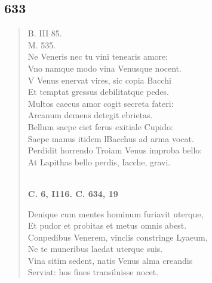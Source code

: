 \documentclass[11pt, a4paper]{report}
\begin{document}
            \subsection*{633}
      \begin{verse}
      B. III 85. \\ M. 535. \\ Ne Veneris nec tu vini tenearis amore; \\ Vno namque modo vina Venusque nocent. \\ V Venus enervat vires, sic copia Bacchi \\ Et temptat gressus debilitatque pedes. \\ Multos caecus amor cogit secreta fateri: \\ Arcanum demens detegit ebrietas. \\ Bellum saepe ciet ferus exitiale Cupido: \\ Saepe manus itidem lBacchus ad arma vocat. \\ Perdidit horrendo Troiam Venus improba bello: \\ At Lapithas bello perdis, Iacche, gravi. \\ 
        ﻿\pagebreak 
    \begin{center} \textbf{C. 6, I116. C. 634, 19} \end{center} \marginpar{[100]} Denique cum mentes hominum furiavit uterque, \\ Et pudor et probitas et metus omnis abest. \\ Conpedibus Venerem, vinclis constringe Lyaeum, \\ Ne te muneribus laedat uterque suis. \\ Vina sitim sedent, natis Venus alma creandis \\ Serviat: hos fines transiluisse nocet. \\ 
      \end{verse}
  
\end{document}
